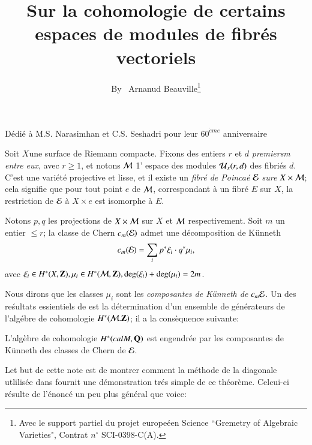 \title{Sur la cohomologie de certains espaces de modules de fibr\'es vectoriels}

\author{By~ Arnanud Beauville\footnote{Avec le support partiel du projet europe\'een Science ``Gremetry of Algebraic Varieties", Contrat $n^{\circ}$ SCI-0398-C(A).}}

\date{}
\maketitle

\begin{center}
D\'edi\'e \`a M.S. Narasimhan et C.S. Seshadri pour leur $60^{{\grave{e}}me}$ anniversaire
\end{center}

Soit $X$\pageoriginale une surface de Riemann compacte. Fixons des entiers $r$ et $d$ \textit{premiersm entre eux}, avec $r\geq 1$, et notons $\mathcal{M}$ 1' espace des modules $\mathcal{U}_{x}(r,d)$ des fibri\'es $d$. C'est une vari\'et\'e projective et lisse, et il existe un \textit{fibr\'e de Poinca\'e $\bf\mathcal{E}$ sure $X \times \mathcal{M}$}; cela signifie que pour tout point $e$ de $\mathcal{M}$, correspondant \`a un fibr\'e $E$ sur $X$, la restriction de $\mathcal{E}$ \`a $X \times{e}$ est isomorphe \`a $E$.  

Notons $p,q$ les projections de $X \times \mathcal{M}$ sur $X$ et $\mathcal{M}$ respectivement. Soit $m$ un entier $\leq r$; la 
classe de Chern $c_{m}(\mathcal{E})$ admet une d\'ecomposition de K\"unneth
$$
c_{m}(\mathcal{E}) = \sum\limits_{i}p^{*}\xi_{i} \cdot q^{*} \mu_{i}, 
$$
avec $\xi_{i} \in H ^{*}(X, \mathbf{Z}), \mu_{i} \in H^{*}(\mathcal{M}, \mathbf{Z}),\deg(\xi_{i}) + \deg(\mu_{i}) =2m$. 

Nous dirons que les classes $\mu_{i}$ sont les \textit{composantes de K\"unneth de $c_{m}{\mathcal{E}}$}. Un des re\'sultats essientiels de \cite{art3-keyA-B} est la d\'etermination d'un ensemble de g\'en\'erateurs de l'alg\'ebre de cohomologie $H^{*}(\mathcal{M}. \mathbf{Z})$; il a la cons\`equence suivante:

\begin{theoreme*}
L'alg\`ebre de cohomologie $H^{*} (calM, \mathbf{Q})$ est engendr\'ee par les composantes de K\"unneth des classes de Chern de ${\mathcal{E}}$. 
\end{theoreme*}

Let but de cette note est de montrer comment la m\'ethode de la diagonale utlilis\'ee dans \cite{art3-keyE-S} fournit une d\'emonstration tr\'es simple de ce th\'eor\`eme. Celcui-ci r\'esulte de l'\'enonc\'e un peu plus g\'en\'eral que voice:

